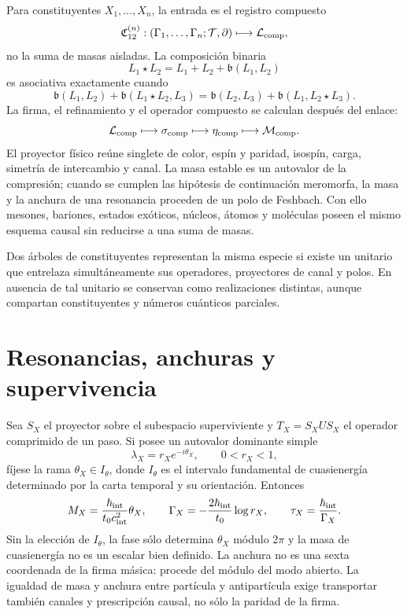 Para constituyentes \(X_1,\ldots,X_n\), la entrada es el registro compuesto
\[
 \mathfrak C_{12}^{(n)}:
 (\Gamma_1,\ldots,\Gamma_n;\mathcal T,\partial)
 \longmapsto\mathcal L_{\rm comp},
\]
no la suma de masas aisladas. La composición binaria
\[
 L_1\star L_2=L_1+L_2+\mathfrak b(L_1,L_2)
\]
es asociativa exactamente cuando
\[
 \mathfrak b(L_1,L_2)+\mathfrak b(L_1\star L_2,L_3)
 =\mathfrak b(L_2,L_3)+\mathfrak b(L_1,L_2\star L_3).
\]
La firma, el refinamiento y el operador compuesto se calculan después del
enlace:
\[
 \mathcal L_{\rm comp}\longmapsto\sigma_{\rm comp}
 \longmapsto\eta_{\rm comp}\longmapsto\mathcal M_{\rm comp}.
\]
El proyector físico reúne singlete de color, espín y paridad, isospín, carga,
simetría de intercambio y canal. La masa estable es un autovalor de la
compresión; cuando se cumplen las hipótesis de continuación meromorfa, la masa
y la anchura de una resonancia proceden de un polo de Feshbach. Con ello
mesones, bariones, estados exóticos, núcleos, átomos y
moléculas poseen el mismo esquema causal sin reducirse a una suma de masas.

Dos árboles de constituyentes representan la misma especie si existe un
unitario que entrelaza simultáneamente sus operadores, proyectores de canal y
polos. En ausencia de tal unitario se conservan como realizaciones distintas,
aunque compartan constituyentes y números cuánticos parciales.

\section{Resonancias, anchuras y supervivencia}

Sea \(S_X\) el proyector sobre el subespacio superviviente y
\(T_X=S_X U S_X\) el operador comprimido de un paso. Si posee un autovalor
dominante simple
\[
 \lambda_X=r_X e^{-i\theta_X},\qquad 0<r_X<1,
\]
fíjese la rama \(\theta_X\in I_\theta\), donde \(I_\theta\) es el intervalo
fundamental de cuasienergía determinado por la carta temporal y su orientación.
Entonces
\[
 M_X=\frac{\hbar_{\rm int}}{t_0c_{\rm int}^2}\theta_X,
 \qquad
 \Gamma_X=-\frac{2\hbar_{\rm int}}{t_0}\log r_X,
 \qquad
 \tau_X=\frac{\hbar_{\rm int}}{\Gamma_X}.
\]
Sin la elección de \(I_\theta\), la fase sólo determina \(\theta_X\) módulo
\(2\pi\) y la masa de cuasienergía no es un escalar bien definido.
La anchura no es una sexta coordenada de la firma másica: procede del módulo
del modo abierto. La igualdad de masa y anchura entre partícula y
antipartícula exige transportar también canales y prescripción causal, no sólo
la paridad de la firma.

